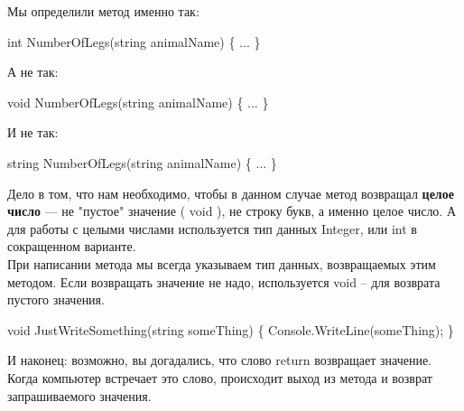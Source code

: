 \documentclass[12pt, a4paper]{article}
\begin{document}
Мы определили метод именно так:\\

\begin{spverbatim}int NumberOfLegs(string animalName)
\{
...
\}\end{spverbatim}

А не так:\\

\begin{spverbatim}void NumberOfLegs(string animalName)
\{
...
\}\end{spverbatim}

И не так:\\

\begin{spverbatim}string NumberOfLegs(string animalName)
\{
...
\}\end{spverbatim}

Дело в том, что нам необходимо, чтобы в данном случае метод возвращал \textbf{целое число}  — не "пустое" значение ( void ), не строку букв, а именно целое число. А для работы с целыми числами используется тип данных Integer, или int  в сокращенном варианте.\\

При написании метода мы всегда указываем тип данных, возвращаемых этим методом. Если возвращать значение не надо, используется void  – для возврата пустого значения.\\

\begin{spverbatim}void JustWriteSomething(string someThing)
\{
  Console.WriteLine(someThing);
\}\end{spverbatim}

И наконец: возможно, вы догадались, что слово return  возвращает значение. Когда компьютер встречает это слово, происходит выход из метода и возврат запрашиваемого значения.\\
\end{document}
